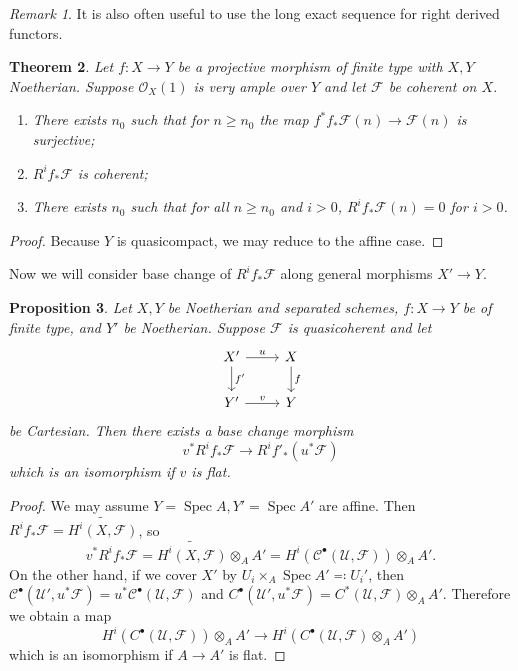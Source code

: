 \documentclass[leqno, openany]{memoir}
\newtheorem{thm}{Theorem}[section]
\newtheorem{prop}[thm]{Proposition}
\theoremstyle{definition}
\theoremstyle{remark}
\newtheorem{rmk}[thm]{Remark}
\theoremstyle{plain}
\theoremstyle{definition}
\theoremstyle{remark}
\newcommand{\mc}[1]{\mathcal{#1}}
\newcommand{\wt}[1]{\widetilde{#1}}
\DeclareMathOperator{\Spec}{Spec}
\begin{document}
\begin{rmk}
    It is also often useful to use the long exact sequence for right derived functors.
\end{rmk}

\begin{thm}
    Let $f \colon X \to Y$ be a projective morphism of finite type with $X, Y$ Noetherian. Suppose $\mc{O}_X(1)$ is very ample over $Y$ and let $\mc{F}$ be coherent on $X$.
    \begin{enumerate}
        \item There exists $n_0$ such that for $n \geq n_0$ the map $f^* f_* \mc{F}(n) \to \mc{F}(n)$ is surjective;
        \item $R^i f_* \mc{F}$ is coherent;
        \item   There exists $n_0$ such that for all $n \geq n_0$ and $i > 0$, $R^i f_* \mc{F}(n) = 0$ for $i > 0$.
    \end{enumerate}
\end{thm}

\begin{proof}
    Because $Y$ is quasicompact, we may reduce to the affine case.
\end{proof}

Now we will consider base change of $R^i f_* \mc{F}$ along general morphisms $X' \to Y$.

\begin{prop}
    Let $X, Y$ be Noetherian and separated schemes, $f \colon X \to Y$ be of finite type, and $Y'$ be Noetherian. Suppose $\mc{F}$ is quasicoherent and let
    \begin{equation*}
    \begin{tikzcd}
        X' \ar{r}{u} \ar{d}{f'} & X \ar{d}{f} \\
        Y' \ar{r}{v} & Y
    \end{tikzcd}
    \end{equation*}
    be Cartesian. Then there exists a base change morphism
    \[ v^* R^i f_* \mc{F} \to R^i f'_* (u^* \mc{F}) \]
    which is an isomorphism if $v$ is flat.
\end{prop}

\begin{proof}
    We may assume $Y = \Spec A, Y' = \Spec A'$ are affine. Then $R^i f_* \mc{F} = \wt{H^i(X, \mc{F})}$, so 
    \[ v^* R^i f_* \mc{F} = \wt{H^i(X, \mc{F})} \otimes_A A' = H^i(\mc{C}^{\bullet}(\mc{U}, \mc{F})) \otimes_A A'. \]
    On the other hand, if we cover $X'$ by $U_i \times_A \Spec A' \eqqcolon U_i'$, then $\mc{C}^{\bullet}(\mc{U}', u^* \mc{F}) = u^* \mc{C}^{\bullet}(\mc{U}, \mc{F})$ and $C^{\bullet}(\mc{U}', u^* \mc{F}) = C^*(\mc{U}, \mc{F}) \otimes_A A'$. Therefore we obtain a map
    \[ H^i(C^{\bullet}(\mc{U}, \mc{F})) \otimes_A A' \to H^i(C^{\bullet}(\mc{U}, \mc{F}) \otimes_A A') \]
    which is an isomorphism if $A \to A'$ is flat.
\end{proof}
\end{document}
